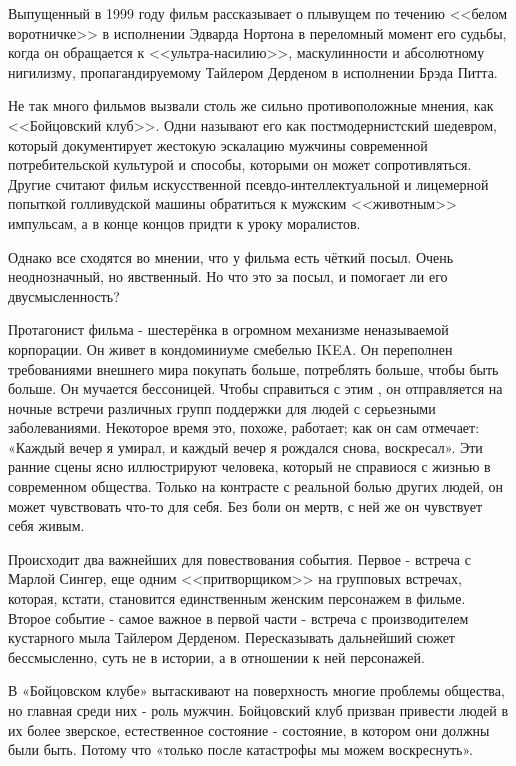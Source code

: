 Выпущенный в 1999 году фильм рассказывает о плывущем по течению <<белом воротничке>> в исполнении Эдварда Нортона в переломный момент его судьбы, когда он обращается к <<ультра-насилию>>, маскулинности и абсолютному нигилизму, пропагандируемому Тайлером Дерденом в исполнении Брэда Питта.

Не так много фильмов вызвали столь же сильно противоположные мнения, как <<Бойцовский клуб>>. Одни называют его как постмодернистский шедевром, который документирует жестокую эскалацию мужчины современной потребительской культурой и способы, которыми он может сопротивляться. Другие считают фильм искусственной псевдо-интеллектуальной и лицемерной попыткой голливудской машины обратиться к мужским <<животным>> импульсам, а в конце концов придти к уроку моралистов.

Однако все сходятся во мнении, что у фильма есть чёткий посыл. Очень неоднозначный, но явственный. Но что это за посыл, и помогает ли его двусмысленность?

Протагонист фильма - шестерёнка в огромном механизме неназываемой корпорации. Он живет в кондоминиуме смебелью IKEA. Он переполнен требованиями внешнего мира покупать больше, потреблять больше, чтобы быть больше. Он мучается бессоницей. Чтобы справиться с этим , он отправляется на ночные встречи различных групп поддержки для людей с серьезными заболеваниями. Некоторое время это, похоже, работает; как он сам отмечает: «Каждый вечер я умирал, и каждый вечер я рождался снова, воскресал». Эти ранние сцены ясно иллюстрируют человека, который не справиося с жизнью в современном общества. Только на контрасте с реальной болью других людей, он может чувствовать что-то для себя. Без боли он мертв, с ней же он чувствует себя живым.

Происходит два важнейших  для повествования события. Первое  - встреча с Марлой Сингер, еще одним <<притворщиком>> на групповых встречах, которая, кстати, становится единственным женским персонажем в фильме. Второе событие - самое важное в первой части - встреча с производителем кустарного мыла Тайлером Дерденом. Пересказывать дальнейший сюжет бессмысленно, суть не в истории, а в отношении к ней персонажей.

В «Бойцовском клубе» вытаскивают на поверхность многие проблемы общества, но главная среди них -  роль мужчин. Бойцовский клуб призван привести людей в их более зверское, естественное состояние - состояние, в котором они должны были быть. Потому что «только после катастрофы мы можем воскреснуть».
